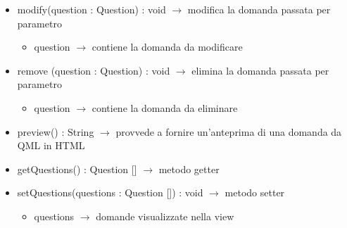\begin{description}
\begin{itemize}
	\item modify(question : Question) : void $\rightarrow$ modifica la domanda passata per parametro\begin{itemize}
		\item question $\rightarrow$ contiene  la domanda da modificare 
	\end{itemize}
	
	\item remove (question : Question) : void $\rightarrow$ elimina la domanda passata per parametro\begin{itemize}
		\item question $\rightarrow$ contiene la domanda da eliminare 
	\end{itemize}
	
	\item preview() : String $\rightarrow$ provvede a fornire un'anteprima di una domanda da QML in HTML
	\item getQuestions() : Question [] $\rightarrow$ metodo getter
	\item setQuestions(questions : Question []) : void $\rightarrow$ metodo setter\begin{itemize}
		\item questions $\rightarrow$ domande visualizzate nella view
	\end{itemize}
	
\end{itemize}

\end{description}

